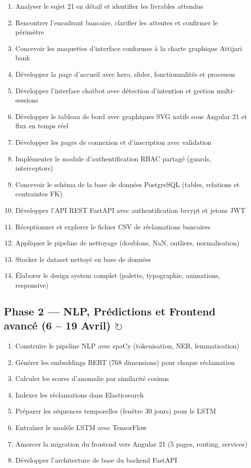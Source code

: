 \documentclass[12pt,a4paper]{report}
\newcommand{\inprog}{\textcolor{blueProgress}{$\circlearrowright$}}
\begin{document}
\begin{enumerate}[noitemsep]
    \item Analyser le sujet 21 en détail et identifier les livrables attendus
    \item Rencontrer l'encadrant bancaire, clarifier les attentes et confirmer le périmètre
    \item Concevoir les maquettes d'interface conformes à la charte graphique Attijari bank
    \item Développer la page d'accueil avec hero, slider, fonctionnalités et processus
    \item Développer l'interface chatbot avec détection d'intention et gestion multi-sessions
    \item Développer le tableau de bord avec graphiques SVG natifs sous Angular 21 et flux en temps réel
    \item Développer les pages de connexion et d'inscription avec validation
    \item Implémenter le module d'authentification RBAC partagé (guards, interceptors)
    \item Concevoir le schéma de la base de données PostgreSQL (tables, relations et contraintes FK)
    \item Développer l'API REST FastAPI avec authentification bcrypt et jetons JWT
    \item Réceptionner et explorer le fichier CSV de réclamations bancaires
    \item Appliquer le pipeline de nettoyage (doublons, NaN, outliers, normalisation)
    \item Stocker le dataset nettoyé en base de données
    \item Élaborer le design system complet (palette, typographie, animations, responsive)
\end{enumerate}

\subsection{Phase 2 --- NLP, Prédictions et Frontend avancé (6 -- 19 Avril) \inprog}

\begin{enumerate}[noitemsep, start=15]
    \item Construire le pipeline NLP avec spaCy (tokenisation, NER, lemmatisation)
    \item Générer les embeddings BERT (768 dimensions) pour chaque réclamation
    \item Calculer les scores d'anomalie par similarité cosinus
    \item Indexer les réclamations dans Elasticsearch
    \item Préparer les séquences temporelles (fenêtre 30 jours) pour le LSTM
    \item Entraîner le modèle LSTM avec TensorFlow
    \item Amorcer la migration du frontend vers Angular 21 (5 pages, routing, services)
    \item Développer l'architecture de base du backend FastAPI
\end{enumerate}
\end{document}
